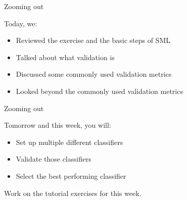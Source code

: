 \documentclass[compress]{beamer}
\begin{document}
\begin{frame}[fragile]{Zooming out} 
	
\begin{alertblock}{Today, we:}
\begin{itemize}
	\item Reviewed the exercise and the basic steps of SML
	\item Talked about what validation is
	\item Discussed some commonly used validation metrics
	\item Looked beyond the commonly used validation metrics
\end{itemize}
\end{alertblock}
	
\end{frame}


\begin{frame}[fragile]{Zooming out} 
	
\begin{alertblock}{Tomorrow and this week, you will:}
\begin{itemize}
	\item Set up multiple different classifiers
	\item Validate those classifiers
	\item Select the best performing classifier
\end{itemize}
\end{alertblock}
	
Work on the tutorial exercises for this week. \\\
\end{frame}
\end{document}
